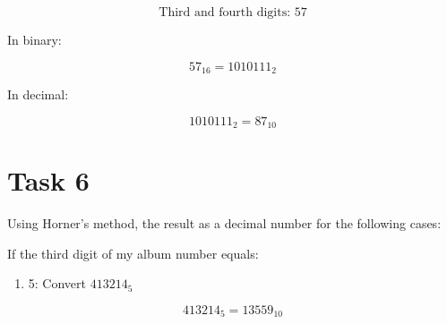 \documentclass{article}
\begin{document}
\[
\text{Third and fourth digits: } 57
\]

In binary:

\[
57_{16} = 1010111_2
\]

In decimal:

\[
1010111_2 = 87_{10}
\]
\section*{Task 6}
Using Horner's method, the result as a decimal number for the following cases:

If the third digit of my album number equals:

\begin{enumerate}
    \item 5: Convert \( 413214_5 \)
\end{enumerate}
\[
413214_5 = 13559_{10}
\]
\end{document}

